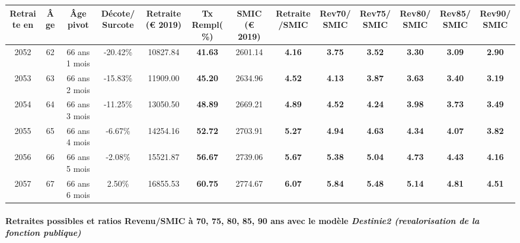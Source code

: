 { \scriptsize \begin{center} 
\begin{tabular}[htb]{|c|c||c|c||c|c||c||c|c|c|c|c|c|} 
\hline 
 Retraite en &  Âge &  Âge pivot &  Décote/Surcote &  Retraite (\euro{} 2019) &  Tx Rempl(\%) &  SMIC (\euro{} 2019) &  Retraite/SMIC &  Rev70/SMIC &  Rev75/SMIC &  Rev80/SMIC &  Rev85/SMIC &  Rev90/SMIC \\ 
\hline \hline 
 2052 &  62 &  66 ans 1 mois &  -20.42\% &  10827.84 &  {\bf 41.63} &  2601.14 &  {\bf 4.16} &  {\bf 3.75} &  {\bf 3.52} &  {\bf 3.30} &  {\bf 3.09} &  {\bf 2.90} \\ 
\hline 
 2053 &  63 &  66 ans 2 mois &  -15.83\% &  11909.00 &  {\bf 45.20} &  2634.96 &  {\bf 4.52} &  {\bf 4.13} &  {\bf 3.87} &  {\bf 3.63} &  {\bf 3.40} &  {\bf 3.19} \\ 
\hline 
 2054 &  64 &  66 ans 3 mois &  -11.25\% &  13050.50 &  {\bf 48.89} &  2669.21 &  {\bf 4.89} &  {\bf 4.52} &  {\bf 4.24} &  {\bf 3.98} &  {\bf 3.73} &  {\bf 3.49} \\ 
\hline 
 2055 &  65 &  66 ans 4 mois &  -6.67\% &  14254.16 &  {\bf 52.72} &  2703.91 &  {\bf 5.27} &  {\bf 4.94} &  {\bf 4.63} &  {\bf 4.34} &  {\bf 4.07} &  {\bf 3.82} \\ 
\hline 
 2056 &  66 &  66 ans 5 mois &  -2.08\% &  15521.87 &  {\bf 56.67} &  2739.06 &  {\bf 5.67} &  {\bf 5.38} &  {\bf 5.04} &  {\bf 4.73} &  {\bf 4.43} &  {\bf 4.16} \\ 
\hline 
 2057 &  67 &  66 ans 6 mois &  2.50\% &  16855.53 &  {\bf 60.75} &  2774.67 &  {\bf 6.07} &  {\bf 5.84} &  {\bf 5.48} &  {\bf 5.14} &  {\bf 4.81} &  {\bf 4.51} \\ 
\hline 
\hline 
\end{tabular} 
\end{center} } 
\paragraph{Retraites possibles et ratios Revenu/SMIC à 70, 75, 80, 85, 90 ans avec le modèle \emph{Destinie2 (revalorisation de la fonction publique)}}  
 
